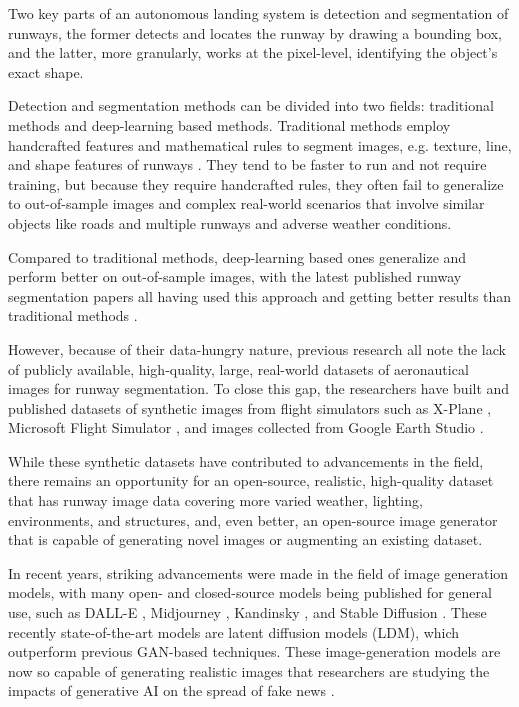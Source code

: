 Two key parts of an autonomous landing system is detection and segmentation of runways, the former detects and locates the runway by drawing a bounding box, and the latter, more granularly, works at the pixel-level, identifying the object's exact shape.

Detection and segmentation methods can be divided into two fields: traditional methods and deep-learning based methods. Traditional methods employ handcrafted features and mathematical rules to segment images, e.g. texture, line, and shape features of runways \cite{aytekin_texture-based_2013, ye_research_2020}. They tend to be faster to run and not require training, but because they require handcrafted rules, they often fail to generalize to out-of-sample images and complex real-world scenarios that involve similar objects like roads and multiple runways and adverse weather conditions.

Compared to traditional methods, deep-learning based ones generalize and perform better on out-of-sample images, with the latest published runway segmentation papers all having used this approach and getting better results than traditional methods \cite{chen_image-based_2024, wang_valnet_2024}.

However, because of their data-hungry nature, previous research \cite{wang_valnet_2024, chen_image-based_2024, chen_bars_2023, ducoffe_lard_2023} all note the lack of publicly available, high-quality, large, real-world datasets of aeronautical images for runway segmentation. To close this gap, the researchers have built and published datasets of synthetic images from flight simulators such as X-Plane \cite{chen_bars_2023, wang_valnet_2024}, Microsoft Flight Simulator \cite{chen_image-based_2024}, and images collected from Google Earth Studio \cite{ducoffe_lard_2023}.

While these synthetic datasets have contributed to advancements in the field, there remains an opportunity for an open-source, realistic, high-quality dataset that has runway image data covering more varied weather, lighting, environments, and structures, and, even better, an open-source image generator that is capable of generating novel images or augmenting an existing dataset.

In recent years, striking advancements were made in the field of image generation models, with many open- and closed-source models being published for general use, such as DALL-E \cite{betker_improving_nodate}, Midjourney \cite{midjourney_midjourney_nodate}, Kandinsky \cite{arkhipkin_kandinsky_2024}, and Stable Diffusion \cite{rombach_high-resolution_2022}. These recently state-of-the-art models are latent diffusion models (LDM), which outperform previous GAN-based techniques. These image-generation models are now so capable of generating realistic images that researchers are studying the impacts of generative AI on the spread of fake news \cite{loth_blessing_2024}.


